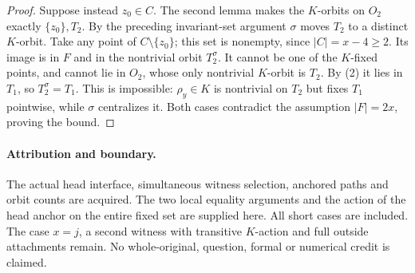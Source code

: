 \documentclass[11pt,a4paper]{article}
\begin{document}
\begin{proof}
Suppose instead $z_0\in C$. The second lemma
makes the $K$-orbits on $O_2$ exactly
$\{z_0\},T_2$. By the preceding invariant-set
argument $\sigma$ moves $T_2$ to a distinct
$K$-orbit. Take any point of
$C\setminus\{z_0\}$; this set is nonempty,
since $|C|=x-4\ge2$. Its image is in $F$
and in the nontrivial orbit $T_2^\sigma$.
It cannot be one of the $K$-fixed points,
and cannot lie in $O_2$, whose only nontrivial
$K$-orbit is $T_2$. By (2) it lies in $T_1$,
so $T_2^\sigma=T_1$. This is impossible:
$\rho_y\in K$ is nontrivial on $T_2$ but
fixes $T_1$ pointwise, while $\sigma$
centralizes it. Both cases contradict the
assumption $|F|=2x$, proving the bound.
\end{proof}

\paragraph{Attribution and boundary.}
The actual head interface, simultaneous witness
selection, anchored paths and orbit counts are
acquired. The two local equality arguments and
the action of the head anchor on the entire
fixed set are supplied here. All short cases
are included. The case $x=j$, a second witness
with transitive $K$-action and full outside
attachments remain. No whole-original, question,
formal or numerical credit is claimed.
\end{document}
